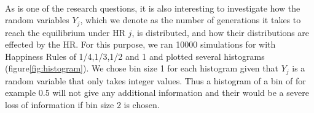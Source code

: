 \\
As is one of the research questions, it is also interesting to investigate how the random variables $Y_j$, which we denote as the number of generations it takes to reach the equilibrium under HR $j$, is distributed, and how their distributions are effected by the HR. For this purpose, we ran 10000 simulations for with Happiness Rules of 1/4,1/3,1/2 and 1 and plotted several histograms (figure\ref{fig:histogram}). We chose bin size 1 for each histogram given that $Y_j$ is a random variable that only takes integer values. Thus a histogram of a bin of for example 0.5 will not give any additional information and their would be a severe loss of information if bin size 2 is chosen. 
\\

\begin{figure}[H]
	

\end{figure}

